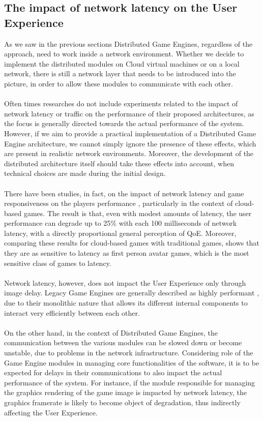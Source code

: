 \subsection{The impact of network latency on the User Experience}
As we saw in the previous sections Distributed Game Engines, regardless of the approach, need to work inside a network environment. Whether we decide to implement the distributed modules on Cloud virtual machines or on a local network, there is still a network layer that needs to be introduced into the picture, in order to allow these modules to communicate with each other. \\ \\
Often times researches do not include experiments related to the impact of network latency or traffic on the performance of their proposed architectures, as the focus is generally directed towards the actual performance of the system. \\
However, if we aim to provide a practical implementation of a Distributed Game Engine architecture, we cannot simply ignore the presence of these effects, which are present in realistic network environments. Moreover, the development of the distributed architecture itself should take these effects into account, when technical choices are made during the initial design. \\ \\
There have been studies, in fact, on the impact of network latency and game responsiveness on the players performance \cite{womak:framerate-player-FPS, womak:user-tolerance-latency, womak:player-latency-cloud}, particularly in the context of cloud-based games. The result is that, even with modest amounts of latency, the user performance can degrade up to 25\% with each 100 milliseconds of network latency, with a directly proportional general perception of QoE. Moreover, comparing these results for cloud-based games with traditional games, shows that they are as sensitive to latency as first person avatar games, which is the most sensitive class of games to latency. \\ \\
Network latency, however, does not impact the User Experience only through image delay. Legacy Game Engines are generally described as highly performant \cite{womak:revamping-cloud-games}, due to their monolithic nature that allows its different internal components to interact very efficiently between each other. \\ \\
On the other hand, in the context of Distributed Game Engines, the communication between the various modules can be slowed down or become unstable, due to problems in the network infrastructure. Considering role of the Game Engine modules in managing core functionalities of the software, it is to be expected for delays in their communications to also impact the actual performance of the system. For instance, if the module responsible for managing the graphics rendering of the game image is impacted by network latency, the graphics framerate is likely to become object of degradation, thus indirectly affecting the User Experience. \\ \\
